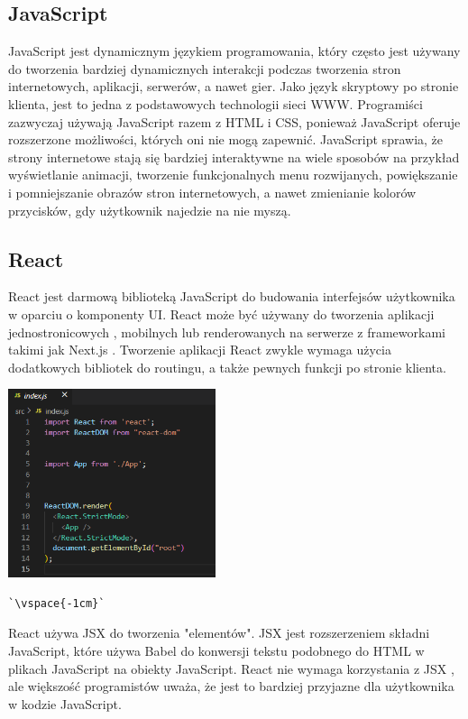 \documentclass[10pt,a4paper]{report}
\begin{document}
\begin{adjustwidth}{2cm}{2cm}
\subsection{JavaScript}
\begin{minipage}{1\linewidth}
JavaScript  jest dynamicznym językiem programowania, który często jest używany do tworzenia bardziej dynamicznych interakcji podczas tworzenia stron internetowych, aplikacji, serwerów, a nawet gier. Jako język skryptowy po stronie klienta, jest to jedna z podstawowych technologii sieci WWW. Programiści zazwyczaj używają JavaScript razem z HTML i CSS, ponieważ JavaScript oferuje rozszerzone możliwości, których oni nie mogą zapewnić. JavaScript sprawia, że strony internetowe stają się bardziej interaktywne na wiele sposobów na przykład wyświetlanie animacji, tworzenie funkcjonalnych menu rozwijanych, powiększanie i pomniejszanie obrazów stron internetowych, a nawet zmienianie kolorów przycisków, gdy użytkownik najedzie na nie myszą. 
\end{minipage}
\subsection{React}
\begin{minipage}{1\linewidth}
React jest darmową biblioteką JavaScript do budowania interfejsów użytkownika w oparciu o komponenty UI. React może być używany do tworzenia aplikacji jednostronicowych , mobilnych lub renderowanych na serwerze z frameworkami takimi jak Next.js . Tworzenie aplikacji React zwykle wymaga użycia dodatkowych bibliotek do routingu, a także pewnych funkcji po stronie klienta. \\
\end{minipage}
\begin{center}
\includegraphics[width=230px]{img/react}
\begin{lstlisting}[escapeinside=``,caption={Przykładowe użycie Reacta w projekcie}]
`\vspace{-1cm}`
\end{lstlisting}
\end{center}
\begin{minipage}{1\linewidth}
React używa JSX do tworzenia "elementów". JSX jest rozszerzeniem składni JavaScript, które używa Babel do konwersji tekstu podobnego do HTML w plikach JavaScript na obiekty JavaScript. React nie wymaga korzystania z JSX , ale większość programistów uważa, że jest to bardziej przyjazne dla użytkownika w kodzie JavaScript.
\end{minipage}

\end{adjustwidth}
\end{document}
